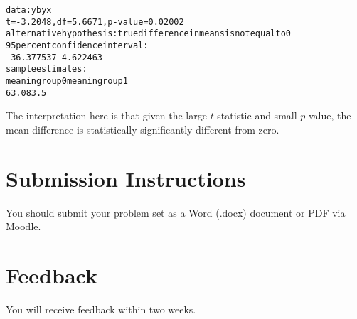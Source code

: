 \documentclass[a4paper]{exam}
\begin{document}
\begin{enumerate}
\begin{enumerate}
\begin{solution}
\begin{alltt}
	data:  y by x
	t = -3.2048, df = 5.6671, p-value = 0.02002
	alternative hypothesis: true difference in means is not equal to 0
	95 percent confidence interval:
	 -36.377537  -4.622463
	sample estimates:
	mean in group 0 mean in group 1 
	           63.0            83.5
	\end{alltt}
	
	The interpretation here is that given the large $t$-statistic and small $p$-value, the mean-difference is statistically significantly different from zero.
	
	\end{solution}
	
	\end{enumerate}

\end{enumerate}

\section{Submission Instructions}\label{submission-instructions}

You should submit your problem set as a Word (.docx) document or PDF via Moodle.

\section{Feedback}\label{feedback}

You will receive feedback within two weeks.
\end{document}
